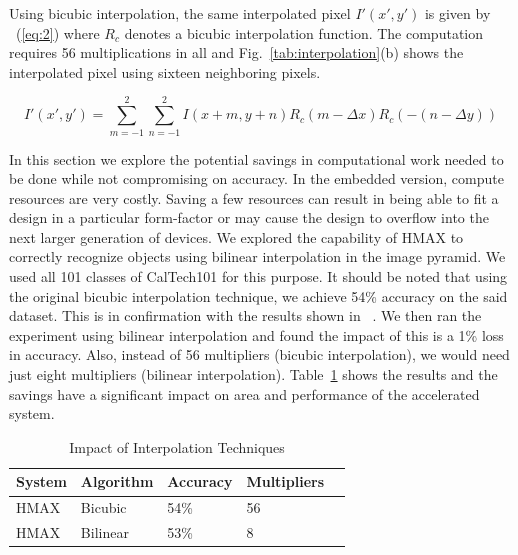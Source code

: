 Using bicubic interpolation, the same interpolated pixel $I'(x',y')$ is given by ~(\ref{eq:2}) where 
$R_c$ denotes a bicubic interpolation function. The computation requires 56 multiplications in all and Fig.~\ref{tab:interpolation}(b) shows the interpolated pixel 
using sixteen neighboring pixels.

{
\begin{equation}
I'(x',y')=\sum_{m=-1}^{2}\sum_{n=-1}^{2}I(x+m,y+n)R_c(m-\Delta x)R_c(-(n-\Delta y))
\label{eq:2}
\end{equation}
}

In this section we explore the potential savings in computational work needed to be done while not compromising on accuracy. 
In the embedded version, compute resources are very costly. Saving a few resources can result in being able to 
fit a design in a particular form-factor or may cause the design to overflow into the next larger generation of devices. We explored the 
capability of HMAX to correctly recognize objects using bilinear interpolation in the image pyramid. We used all 101 classes of CalTech101 
for this purpose. It should be noted that using the original bicubic interpolation technique, we achieve 54\% accuracy on the said dataset. This is in confirmation with the results shown in ~\cite{Mutch2008}. 
We then ran the experiment using bilinear interpolation and found the impact of this is a 1\% loss in accuracy. Also, instead of 
56 multipliers (bicubic interpolation), we would need just eight multipliers (bilinear interpolation). Table~\ref{table:compute} shows the 
results and the savings have a significant impact on area and performance of the accelerated system. 

\begin{table}[h]
\renewcommand{\arraystretch}{1.3}
\caption {Impact of Interpolation Techniques}
\label{table:compute}
\centering
\begin{tabular}{lllll}
 System & Algorithm & Accuracy & Multipliers\\\hline
 HMAX	& Bicubic   & 54\% & 56\\\hline
 HMAX   & Bilinear  & 53\% & 8\\\hline
\end{tabular}
\end{table}
